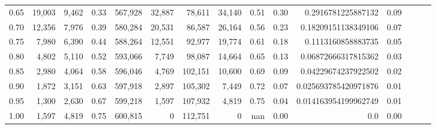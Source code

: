 \begin{tabular}{rrrrrrrrrrrrrrr}
0.65 &  19,003 &   9,462 &  0.33 &  567,928 &   32,887 &   78,611 &   34,140 &  0.51 &  0.30 &    0.2916781225887132 &      0.09 \\
0.70 &  12,356 &   7,976 &  0.39 &  580,284 &   20,531 &   86,587 &   26,164 &  0.56 &  0.23 &   0.18209151138349106 &      0.07 \\
0.75 &   7,980 &   6,390 &  0.44 &  588,264 &   12,551 &   92,977 &   19,774 &  0.61 &  0.18 &    0.1113160858883735 &      0.05 \\
0.80 &   4,802 &   5,110 &  0.52 &  593,066 &    7,749 &   98,087 &   14,664 &  0.65 &  0.13 &   0.06872666317815362 &      0.03 \\
0.85 &   2,980 &   4,064 &  0.58 &  596,046 &    4,769 &  102,151 &   10,600 &  0.69 &  0.09 &   0.04229674237922502 &      0.02 \\
0.90 &   1,872 &   3,151 &  0.63 &  597,918 &    2,897 &  105,302 &    7,449 &  0.72 &  0.07 &  0.025693785420971876 &      0.01 \\
0.95 &   1,300 &   2,630 &  0.67 &  599,218 &    1,597 &  107,932 &    4,819 &  0.75 &  0.04 &  0.014163954199962749 &      0.01 \\
1.00 &   1,597 &   4,819 &  0.75 &  600,815 &        0 &  112,751 &        0 &   nan &  0.00 &                   0.0 &      0.00 \\
\bottomrule
\end{tabular}
